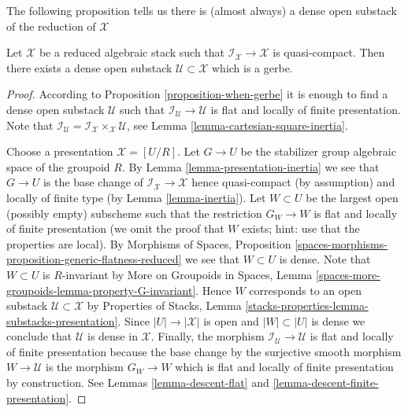 \medskip\noindent
The following proposition tells us there is (almost always) a dense
open substack of the reduction of $\mathcal{X}$

\begin{proposition}
\label{proposition-open-stratum}
Let $\mathcal{X}$ be a reduced algebraic stack such that
$\mathcal{I}_\mathcal{X} \to \mathcal{X}$ is quasi-compact.
Then there exists a dense open substack $\mathcal{U} \subset \mathcal{X}$
which is a gerbe.
\end{proposition}

\begin{proof}
According to
Proposition \ref{proposition-when-gerbe}
it is enough to find a dense open substack $\mathcal{U}$ such that
$\mathcal{I}_\mathcal{U} \to \mathcal{U}$ is flat and locally of finite
presentation. Note that
$\mathcal{I}_\mathcal{U} =
\mathcal{I}_\mathcal{X} \times_\mathcal{X} \mathcal{U}$, see
Lemma \ref{lemma-cartesian-square-inertia}.

\medskip\noindent
Choose a presentation $\mathcal{X} = [U/R]$. Let $G \to U$ be the stabilizer
group algebraic space of the groupoid $R$. By
Lemma \ref{lemma-presentation-inertia}
we see that $G \to U$ is the base change of
$\mathcal{I}_\mathcal{X} \to \mathcal{X}$ hence quasi-compact (by assumption)
and locally of finite type (by
Lemma \ref{lemma-inertia}).
Let $W \subset U$ be the largest open (possibly empty) subscheme such that
the restriction $G_W \to W$ is flat and locally of finite presentation
(we omit the proof that $W$ exists; hint: use that the properties are local).
By
Morphisms of Spaces, Proposition
\ref{spaces-morphisms-proposition-generic-flatness-reduced}
we see that $W \subset U$ is dense. Note that $W \subset U$ is $R$-invariant
by
More on Groupoids in Spaces, Lemma
\ref{spaces-more-groupoids-lemma-property-G-invariant}.
Hence $W$ corresponds to an open substack $\mathcal{U} \subset \mathcal{X}$ by
Properties of Stacks, Lemma
\ref{stacks-properties-lemma-substacks-presentation}.
Since $|U| \to |\mathcal{X}|$ is open and $|W| \subset |U|$ is dense we
conclude that $\mathcal{U}$ is dense in $\mathcal{X}$.
Finally, the morphism $\mathcal{I}_\mathcal{U} \to \mathcal{U}$
is flat and locally of finite presentation because the base change by
the surjective smooth morphism $W \to \mathcal{U}$ is the morphism
$G_W \to W$ which is flat and locally of finite presentation by construction.
See
Lemmas \ref{lemma-descent-flat} and
\ref{lemma-descent-finite-presentation}.
\end{proof}

